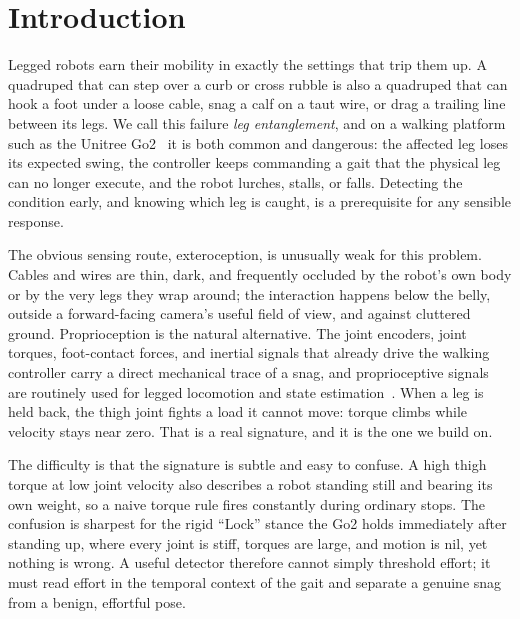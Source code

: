 \documentclass[conference]{IEEEtran}
\begin{document}
\section{Introduction}

Legged robots earn their mobility in exactly the settings that trip them up. A quadruped that can step over a curb or cross rubble is also a quadruped that can hook a foot under a loose cable, snag a calf on a taut wire, or drag a trailing line between its legs. We call this failure \emph{leg entanglement}, and on a walking platform such as the Unitree Go2~\cite{unitree_go2} it is both common and dangerous: the affected leg loses its expected swing, the controller keeps commanding a gait that the physical leg can no longer execute, and the robot lurches, stalls, or falls. Detecting the condition early, and knowing which leg is caught, is a prerequisite for any sensible response.

The obvious sensing route, exteroception, is unusually weak for this problem. Cables and wires are thin, dark, and frequently occluded by the robot's own body or by the very legs they wrap around; the interaction happens below the belly, outside a forward-facing camera's useful field of view, and against cluttered ground. Proprioception is the natural alternative. The joint encoders, joint torques, foot-contact forces, and inertial signals that already drive the walking controller carry a direct mechanical trace of a snag, and proprioceptive signals are routinely used for legged locomotion and state estimation~\cite{hwangbo2019learning,lee2020learning,camurri2017contact}. When a leg is held back, the thigh joint fights a load it cannot move: torque climbs while velocity stays near zero. That is a real signature, and it is the one we build on.

The difficulty is that the signature is subtle and easy to confuse. A high thigh torque at low joint velocity also describes a robot standing still and bearing its own weight, so a naive torque rule fires constantly during ordinary stops. The confusion is sharpest for the rigid ``Lock'' stance the Go2 holds immediately after standing up, where every joint is stiff, torques are large, and motion is nil, yet nothing is wrong. A useful detector therefore cannot simply threshold effort; it must read effort in the temporal context of the gait and separate a genuine snag from a benign, effortful pose.
\end{document}
